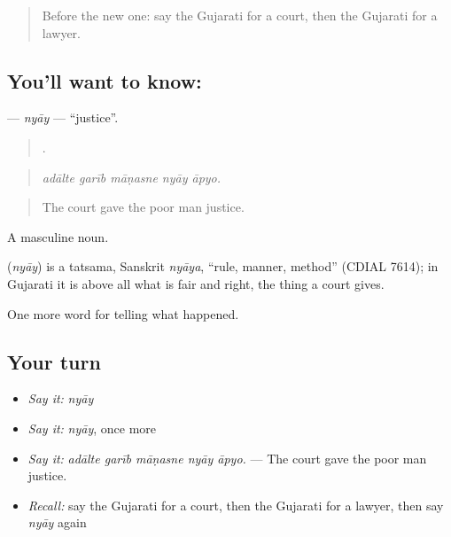 \label{lesson:GU-C289-nyay}



\begin{quote}
Before the new one: say the Gujarati for a court, then the Gujarati for a lawyer.
\end{quote}

\subsection*{You'll want to know: }
\textbf{} — \emph{nyāy} — \textquotedblleft{}justice\textquotedblright{}.

\begin{quote}
    .
\end{quote}

\begin{quote}
\emph{adālte garīb māṇasne nyāy āpyo.}
\end{quote}

\begin{quote}
The court gave the poor man justice.
\end{quote}

A masculine noun.

\begin{cousinweb}
\textbf{} (\emph{nyāy}) is a tatsama, Sanskrit \emph{nyāya}, \textquotedblleft{}rule, manner, method\textquotedblright{} (CDIAL 7614); in Gujarati it is above all what is fair and right, the thing a court gives.
\end{cousinweb}

\begin{grammarlens}[title={What you've built}]
One more word for telling what happened.
\end{grammarlens}

\subsection*{Your turn}
\begin{itemize}
\raggedright
  \item \emph{Say it:} \emph{nyāy}
  \item \emph{Say it:} \emph{nyāy}, once more
  \item \emph{Say it:} \emph{adālte garīb māṇasne nyāy āpyo.} — The court gave the poor man justice.
  \item \emph{Recall:} say the Gujarati for a court, then the Gujarati for a lawyer, then say \emph{nyāy} again
\end{itemize}

